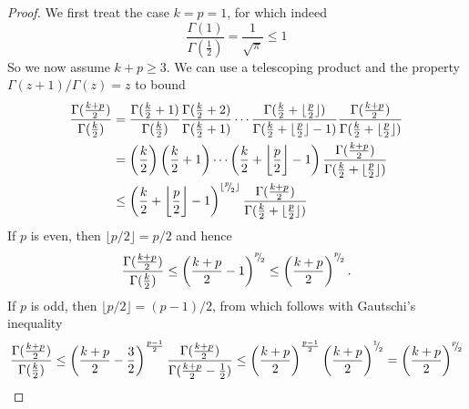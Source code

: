 \documentclass[12pt]{article}
\begin{document}
\begin{proof}
    We first treat the case $k=p=1$, for which indeed
    \begin{equation}
        \frac{\Gamma(1)}{\Gamma(\frac{1}{2})} = \frac{1}{\sqrt{\pi}} \leq 1
    \end{equation}
    So we now assume $k + p \geq 3$. We can use a telescoping product and the property $\Gamma(z+1)/\Gamma(z) = z$ to bound
    \begin{align}
        \frac{\Gamma(\frac{k + p}{2})}{\Gamma(\frac{k}{2})} 
        &= \frac{\Gamma(\frac{k}{2} + 1)}{\Gamma(\frac{k}{2})} \frac{\Gamma(\frac{k}{2} + 2)}{\Gamma(\frac{k}{2} + 1)} \cdots \frac{\Gamma(\frac{k}{2} + \lfloor \frac{p}{2} \rfloor)}{\Gamma(\frac{k}{2} + \lfloor \frac{p}{2} \rfloor - 1)} \frac{\Gamma( \frac{k + p}{2})}{\Gamma(\frac{k}{2} + \lfloor \frac{p}{2} \rfloor)} \notag \\
        &= \left(\frac{k}{2}\right) \left(\frac{k}{2} + 1\right) \cdots \left( \frac{k}{2} + \bigg\lfloor \frac{p}{2} \bigg\rfloor - 1 \right) \frac{\Gamma( \frac{k + p}{2})}{\Gamma(\frac{k}{2} + \lfloor \frac{p}{2} \rfloor)} \notag \\
        &\leq \left(\frac{k}{2} + \bigg\lfloor \frac{p}{2} \bigg\rfloor - 1\right)^{\lfloor {}^{p}{\mskip -5mu/\mskip -3mu}_{2} \rfloor} \frac{\Gamma( \frac{k + p}{2})}{\Gamma(\frac{k}{2} + \lfloor \frac{p}{2} \rfloor)}
    \end{align}
    If $p$ is even, then $\lfloor p/2 \rfloor = p/2$ and hence
    \begin{equation}
        \frac{\Gamma(\frac{k + p}{2})}{\Gamma(\frac{k}{2})} 
        \leq \left( \frac{k + p}{2} - 1 \right)^{{}^{p}{\mskip -5mu/\mskip -3mu}_{2}}
        \leq \left( \frac{k + p}{2}\right)^{{}^{p}{\mskip -5mu/\mskip -3mu}_{2}}.
    \end{equation}
    If $p$ is odd, then $\lfloor p/2 \rfloor = (p - 1)/2$, from which follows with Gautschi's inequality \cite{kershaw-1983-extensions-gautschi}
    \begin{equation}
        \frac{\Gamma(\frac{k + p}{2})}{\Gamma(\frac{k}{2})}
        \leq \left(\frac{k + p}{2} - \frac{3}{2} \right)^{ \frac{p - 1}{2}} \frac{\Gamma( \frac{k + p}{2})}{\Gamma(\frac{k + p}{2} - \frac{1}{2})}
        \leq \left(\frac{k + p}{2}\right)^{ \frac{p - 1}{2}} \left(\frac{k + p}{2}\right)^{{}^{1}{\mskip -5mu/\mskip -3mu}_{2}}
        = \left(\frac{k + p}{2}\right)^{ {}^{p}{\mskip -5mu/\mskip -3mu}_{2}}
    \end{equation}
\end{proof}
\end{document}
